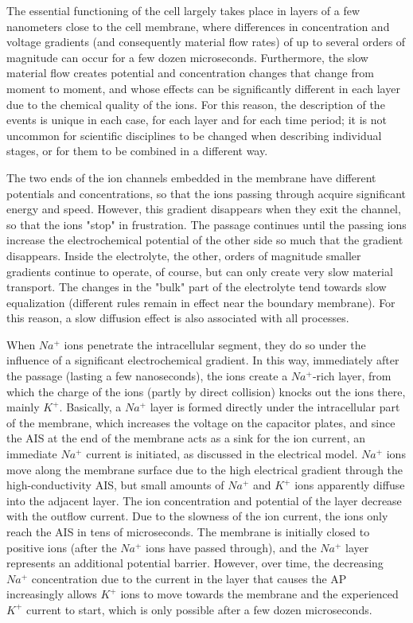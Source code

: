The essential functioning of the cell largely takes place in layers of a few nanometers close to the cell membrane, where differences in concentration and voltage gradients (and consequently material flow rates) of up to several orders of magnitude can occur for a few dozen microseconds. Furthermore, the slow material flow creates potential and concentration changes that change from moment to moment, and whose effects can be significantly different in each layer due to the chemical quality of the ions. For this reason, the description of the events is unique in each case, for each layer and for each time period; it is not uncommon for scientific disciplines to be changed when describing individual stages, or for them to be combined in a different way.

The two ends of the ion channels embedded in the membrane have different potentials and concentrations, so that the ions passing through acquire significant energy and speed. However, this gradient disappears when they exit the channel, so that the ions "stop" in frustration. The passage continues until the passing ions increase the electrochemical potential of the other side so much that the gradient disappears. Inside the electrolyte, the other, orders of magnitude smaller gradients continue to operate, of course, but can only create very slow material transport. The changes in the "bulk" part of the electrolyte tend towards slow equalization (different rules remain in effect near the boundary membrane). For this reason, a slow diffusion effect is also associated with all processes.

When $Na^+$ ions penetrate the intracellular segment, they do so under the influence of a significant electrochemical gradient. In this way, immediately after the passage (lasting a few nanoseconds), the ions create a $Na^+$-rich layer, from which the charge of the ions (partly by direct collision) knocks out the ions there, mainly $K^+$.
Basically, a $Na^+$ layer is formed directly under the intracellular part of the membrane, which increases the voltage on the capacitor plates, and since the \gls{AIS} at the end of the membrane acts as a sink for the ion current, an immediate $Na^+$ current is initiated, as discussed in the electrical model.
$Na^+$ ions move along the membrane surface due to the high electrical gradient through the high-conductivity \gls{AIS}, but small amounts of $Na^+$ and $K^+$ ions apparently diffuse into the adjacent layer. The ion concentration and potential of the layer decrease with the outflow current. Due to the slowness of the ion current, the ions only reach the \gls{AIS} in tens of microseconds.
The membrane is initially closed to positive ions (after the $Na^+$ ions have passed through), and the $Na^+$ layer represents an additional potential barrier. However, over time, the decreasing $Na^+$ concentration due to the current in the layer that causes the \gls{AP} increasingly allows $K^+$ ions to move towards the membrane and the experienced $K^+$ current to start, which is only possible after a few dozen microseconds.

